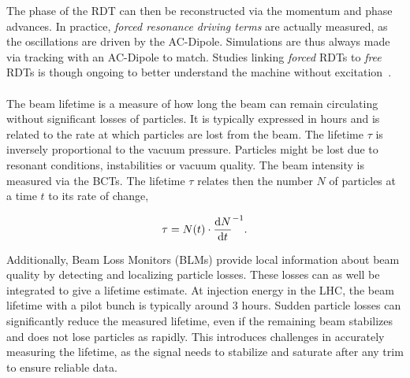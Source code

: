 The phase of the RDT can then be reconstructed via the momentum and phase advances. In practice,
\textit{forced resonance driving terms} are actually measured, as the oscillations are driven by
the AC-Dipole. Simulations are thus always made via tracking with an AC-Dipole to match.
Studies linking \textit{forced} RDTs to \textit{free} RDTs is though ongoing to better understand
the machine without excitation~\cite{carlier_nonlinear_2020}.


\paragraph{}

The beam lifetime is a measure of how long the beam can remain circulating without significant
losses of particles. It is typically expressed in hours and is related to the rate
at which particles are lost from the beam. The lifetime $\tau$ is inversely proportional to the
vacuum pressure.
Particles might be lost due to resonant conditions, instabilities or vacuum quality. The beam
intensity is measured via the BCTs. The lifetime $\tau$ relates then the number $N$ of particles at
a time $t$ to its rate of change,

\begin{equation}
    \tau = N(t) \cdot \frac{\mathop{}\!\mathrm{d} N}{\mathop{}\!\mathrm{d} t}^{-1}.
\end{equation}

Additionally, Beam Loss Monitors (BLMs) provide local information about beam quality by detecting
and localizing particle losses. These losses can as well be integrated to give a lifetime estimate.
At injection energy in the LHC, the beam lifetime with a pilot bunch is typically around 3 hours.
Sudden particle losses can significantly reduce the measured lifetime, even if the remaining beam
stabilizes and does not lose particles as rapidly. This introduces challenges in accurately
measuring the lifetime, as the signal needs to stabilize and saturate after any trim to ensure
reliable data.


\subsection{}
\label{subsection:optics_corrections_chromaticity}


